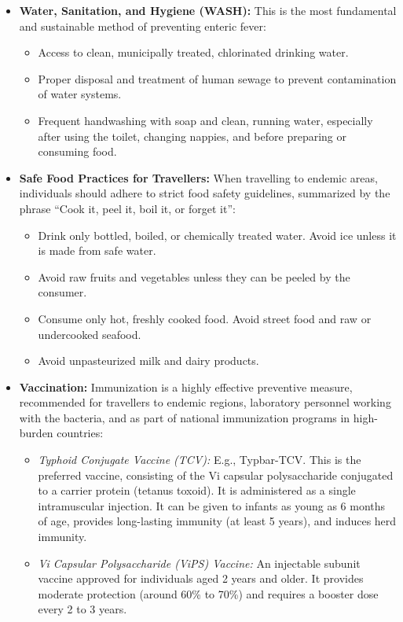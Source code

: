 \begin{itemize}
\item \textbf{Water, Sanitation, and Hygiene (WASH):} This is the most fundamental and sustainable method of preventing enteric fever:
  \begin{itemize}
  \item Access to clean, municipally treated, chlorinated drinking water.
  \item Proper disposal and treatment of human sewage to prevent contamination of water systems.
  \item Frequent handwashing with soap and clean, running water, especially after using the toilet, changing nappies, and before preparing or consuming food.
  \end{itemize}
\item \textbf{Safe Food Practices for Travellers:} When travelling to endemic areas, individuals should adhere to strict food safety guidelines, summarized by the phrase ``Cook it, peel it, boil it, or forget it'':
  \begin{itemize}
  \item Drink only bottled, boiled, or chemically treated water. Avoid ice unless it is made from safe water.
  \item Avoid raw fruits and vegetables unless they can be peeled by the consumer.
  \item Consume only hot, freshly cooked food. Avoid street food and raw or undercooked seafood.
  \item Avoid unpasteurized milk and dairy products.
  \end{itemize}
\item \textbf{Vaccination:} Immunization is a highly effective preventive measure, recommended for travellers to endemic regions, laboratory personnel working with the bacteria, and as part of national immunization programs in high-burden countries:
  \begin{itemize}
  \item \textit{Typhoid Conjugate Vaccine (TCV):} E.g., Typbar-TCV. This is the preferred vaccine, consisting of the Vi capsular polysaccharide conjugated to a carrier protein (tetanus toxoid). It is administered as a single intramuscular injection. It can be given to infants as young as 6 months of age, provides long-lasting immunity (at least 5 years), and induces herd immunity.
  \item \textit{Vi Capsular Polysaccharide (ViPS) Vaccine:} An injectable subunit vaccine approved for individuals aged 2 years and older. It provides moderate protection (around 60\% to 70\%) and requires a booster dose every 2 to 3 years.

\end{itemize}
\end{itemize}
